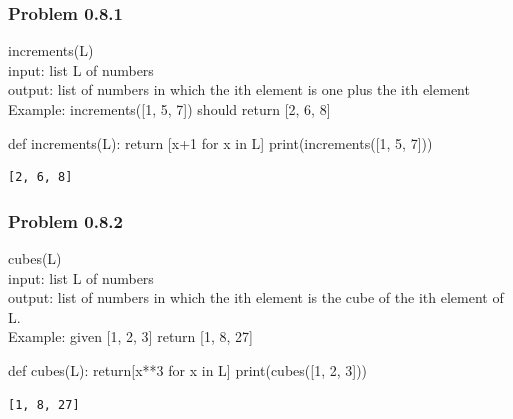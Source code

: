 \documentclass[
  letterpaper,
  DIV=11,
  numbers=noendperiod]{scrartcl}
\newenvironment{Shaded}{\begin{snugshade}}{\end{snugshade}}
\newcommand{\BuiltInTok}[1]{\textcolor[rgb]{0.00,0.23,0.31}{#1}}
\newcommand{\ControlFlowTok}[1]{\textcolor[rgb]{0.00,0.23,0.31}{#1}}
\newcommand{\DecValTok}[1]{\textcolor[rgb]{0.68,0.00,0.00}{#1}}
\newcommand{\KeywordTok}[1]{\textcolor[rgb]{0.00,0.23,0.31}{#1}}
\newcommand{\NormalTok}[1]{\textcolor[rgb]{0.00,0.23,0.31}{#1}}
\newcommand{\OperatorTok}[1]{\textcolor[rgb]{0.37,0.37,0.37}{#1}}
\begin{document}
\hypertarget{problem-0.8.1}{%
\subsubsection{Problem 0.8.1}\label{problem-0.8.1}}

increments(L)\\
input: list L of numbers\\
output: list of numbers in which the ith element is one plus the ith
element Example: increments({[}1, 5, 7{]}) should return {[}2, 6, 8{]}

\begin{Shaded}
\begin{Highlighting}[numbers=left,,]
\KeywordTok{def}\NormalTok{ increments(L): }\ControlFlowTok{return}\NormalTok{ [x}\OperatorTok{+}\DecValTok{1} \ControlFlowTok{for}\NormalTok{ x }\KeywordTok{in}\NormalTok{ L]}
\BuiltInTok{print}\NormalTok{(increments([}\DecValTok{1}\NormalTok{, }\DecValTok{5}\NormalTok{, }\DecValTok{7}\NormalTok{]))}
\end{Highlighting}
\end{Shaded}

\begin{verbatim}
[2, 6, 8]
\end{verbatim}

\hypertarget{problem-0.8.2}{%
\subsubsection{Problem 0.8.2}\label{problem-0.8.2}}

cubes(L)\\
input: list L of numbers\\
output: list of numbers in which the ith element is the cube of the ith
element of L.\\
Example: given {[}1, 2, 3{]} return {[}1, 8, 27{]}

\begin{Shaded}
\begin{Highlighting}[numbers=left,,]
\KeywordTok{def}\NormalTok{ cubes(L): }\ControlFlowTok{return}\NormalTok{[x}\OperatorTok{**}\DecValTok{3} \ControlFlowTok{for}\NormalTok{ x }\KeywordTok{in}\NormalTok{ L]}
\BuiltInTok{print}\NormalTok{(cubes([}\DecValTok{1}\NormalTok{, }\DecValTok{2}\NormalTok{, }\DecValTok{3}\NormalTok{]))}
\end{Highlighting}
\end{Shaded}

\begin{verbatim}
[1, 8, 27]
\end{verbatim}
\end{document}
